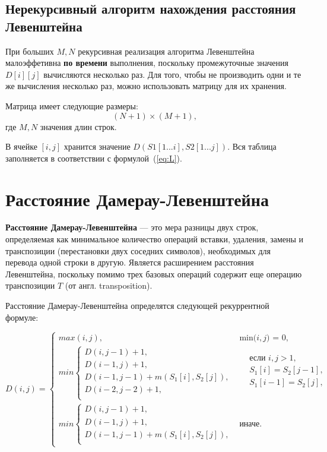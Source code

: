 \subsection{Нерекурсивный алгоритм нахождения расстояния Левенштейна}

При больших $M, N$ рекурсивная реализация алгоритма Левенштейна малоэффетивна \textbf{по времени} выполнения, поскольку промежуточные значения $D[i][j]$ вычисляются несколько раз. Для того, чтобы не производить одни и те же вычисления несколько раз, можно использовать матрицу для их хранения.

Матрица имеет следующие размеры:
\begin{equation}
	\label{eq:lev-m-size}
	(N + 1) \times (M + 1),
\end{equation}
где $M, N$ значения длин строк.

В ячейке $[i, j]$ хранится значение $D(S1[1...i], S2[1...j])$. Вся таблица заполняется в соответствии с формулой~(\ref{eq:L}). 

\section{Расстояние Дамерау-Левенштейна}
\textbf{Расстояние Дамерау-Левенштейна} --- это мера разницы двух строк, определяемая как минимальное количество операций вставки, удаления, замены и транспозиции (перестановки двух соседних символов), необходимых для перевода одной строки в другую. Является расширением расстояния Левенштейна, поскольку помимо трех базовых операций содержит еще операцию транспозиции $T$ (от англ. transposition).

Расстояние Дамерау-Левенштейна определятся следующей рекуррентной формуле:

\begin{equation}
	\label{eq:DL}
	D(i, j) = 
	\begin{cases}
            max(i, j), &\text{min($i, j$) = 0,}\\
		min \begin{cases}
			D(i, j - 1) + 1,\\
			D(i - 1, j) + 1,\\
			D(i - 1, j - 1) + m(S_{1}[i], S_{2}[j]), \\
			D(i - 2, j - 2) + 1, \\
		\end{cases}
		& \begin{aligned}
			& \text{если $i, j > 1$}, \\
			& S_{1}[i] = S_{2}[j - 1], \\
			& S_{1}[i - 1] = S_{2}[j], \\
		\end{aligned}\\
		min \begin{cases}
			D(i, j - 1) + 1,\\
			D(i - 1, j) + 1, \\
			D(i - 1, j - 1) + m(S_{1}[i], S_{2}[j]), \\
		\end{cases}
		 & \text{иначе.}
	\end{cases}
\end{equation}

